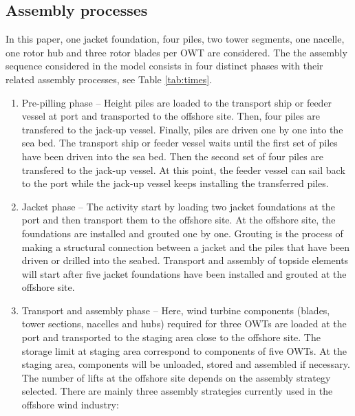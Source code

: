 \subsection{Assembly processes}
In this paper, one jacket foundation, four piles, two tower segments, one nacelle, one rotor hub and three rotor blades per OWT are considered. The the assembly sequence considered in the model consists in four distinct phases with their related assembly processes, see Table \ref{tab:times}.
\begin{enumerate}
\item Pre-pilling phase -- Height piles are loaded to the transport ship or feeder vessel at port and transported to the offshore site. Then, four piles are transfered to the jack-up vessel. Finally, piles are driven one by one into the sea bed. The transport ship or feeder vessel waits until the first set of piles have been driven into the sea bed. Then the second set of four piles are transfered to the jack-up vessel. At this point, the feeder vessel can sail back to the port while the jack-up vessel keeps installing the transferred piles. %

\item Jacket phase -- The activity start by loading two jacket foundations at the port and then transport them to the offshore site. At the offshore site, the foundations are installed and grouted one by one. Grouting is the process of making a structural connection between a jacket and the piles that have been driven or drilled into the seabed. Transport and assembly of topside elements will start after five jacket foundations have been installed and grouted at the offshore site.  

\item Transport and assembly phase -- Here, wind turbine components (blades, tower sections, nacelles and hubs) required for three OWTs are loaded at the port and transported to the staging area close to the offshore site. The storage limit at staging area correspond to components of five OWTs. At the staging area, components will be unloaded, stored and assembled if necessary. The number of lifts at the offshore site depends on the assembly strategy selected. There are mainly three assembly strategies currently used in the offshore wind industry:


\end{enumerate}
